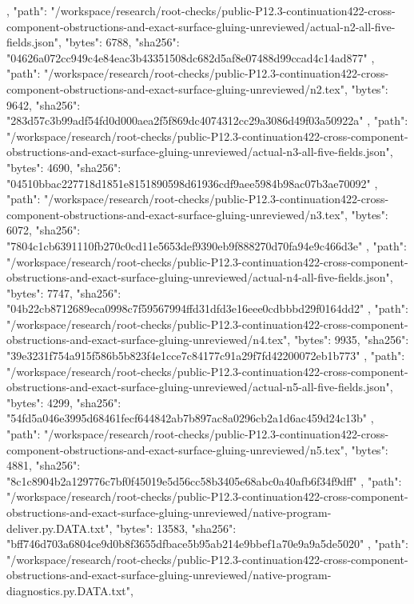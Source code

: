 \documentclass[11pt]{article}
\begin{document}
\begin{Full422Data}
{{    },
    {
      "path": "/workspace/research/root-checks/public-P12.3-continuation422-cross-component-obstructions-and-exact-surface-gluing-unreviewed/actual-n2-all-five-fields.json",
      "bytes": 6788,
      "sha256": "04626a072cc949c4e84eac3b43351508dc682d5af8e07488d99ccad4c14ad877"
    },
    {
      "path": "/workspace/research/root-checks/public-P12.3-continuation422-cross-component-obstructions-and-exact-surface-gluing-unreviewed/n2.tex",
      "bytes": 9642,
      "sha256": "283d57c3b99adf54fd0d000aea2f5f869dc4074312cc29a3086d49f03a50922a"
    },
    {
      "path": "/workspace/research/root-checks/public-P12.3-continuation422-cross-component-obstructions-and-exact-surface-gluing-unreviewed/actual-n3-all-five-fields.json",
      "bytes": 4690,
      "sha256": "04510bbac227718d1851e8151890598d61936cdf9aee5984b98ac07b3ae70092"
    },
    {
      "path": "/workspace/research/root-checks/public-P12.3-continuation422-cross-component-obstructions-and-exact-surface-gluing-unreviewed/n3.tex",
      "bytes": 6072,
      "sha256": "7804c1cb6391110fb270c0cd11e5653def9390eb9f888270d70fa94e9c466d3e"
    },
    {
      "path": "/workspace/research/root-checks/public-P12.3-continuation422-cross-component-obstructions-and-exact-surface-gluing-unreviewed/actual-n4-all-five-fields.json",
      "bytes": 7747,
      "sha256": "04b22cb8712689eca0998c7f59567994ffd31dfd3e16eee0cdbbbd29f0164dd2"
    },
    {
      "path": "/workspace/research/root-checks/public-P12.3-continuation422-cross-component-obstructions-and-exact-surface-gluing-unreviewed/n4.tex",
      "bytes": 9935,
      "sha256": "39e3231f754a915f586b5b823f4e1cce7c84177c91a29f7fd42200072eb1b773"
    },
    {
      "path": "/workspace/research/root-checks/public-P12.3-continuation422-cross-component-obstructions-and-exact-surface-gluing-unreviewed/actual-n5-all-five-fields.json",
      "bytes": 4299,
      "sha256": "54fd5a046e3995d68461fecf644842ab7b897ac8a0296cb2a1d6ac459d24c13b"
    },
    {
      "path": "/workspace/research/root-checks/public-P12.3-continuation422-cross-component-obstructions-and-exact-surface-gluing-unreviewed/n5.tex",
      "bytes": 4881,
      "sha256": "8c1c8904b2a129776c7bf0f45019e5d56cc58b3405e68abc0a40afb6f34f9dff"
    },
    {
      "path": "/workspace/research/root-checks/public-P12.3-continuation422-cross-component-obstructions-and-exact-surface-gluing-unreviewed/native-program-deliver.py.DATA.txt",
      "bytes": 13583,
      "sha256": "bff746d703a6804ce9d0b8f3655dfbace5b95ab214e9bbef1a70e9a9a5de5020"
    },
    {
      "path": "/workspace/research/root-checks/public-P12.3-continuation422-cross-component-obstructions-and-exact-surface-gluing-unreviewed/native-program-diagnostics.py.DATA.txt",
}}
\end{Full422Data}
\end{document}
